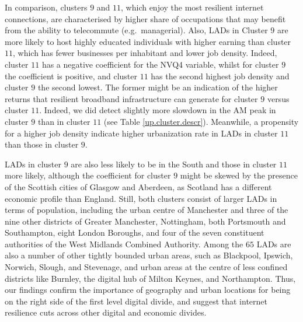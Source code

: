 \documentclass[Royal,times,sageh]{sagej}
\begin{document}
In comparison, clusters \(9\) and \(11\), which enjoy the most resilient
internet connections, are characterised by higher share of occupations
that may benefit from the ability to telecommute (e.g.~managerial).
Also, LADs in Cluster \(9\) are more likely to host highly educated
individuals with higher earning than cluster \(11\), which has fewer
businesses per inhabitant and lower job density. Indeed, cluster \(11\)
has a negative coefficient for the NVQ4 variable, whilst for cluster
\(9\) the coefficient is positive, and cluster \(11\) has the second
highest job density and cluster \(9\) the second lowest. The former
might be an indication of the higher returns that resilient broadband
infrastructure can generate for cluster \(9\) versus cluster \(11\).
Indeed, we did detect slightly more slowdown in the AM peak in cluster
\(9\) than in cluster \(11\) (see Table \ref{up.cluster.descr}).
Meanwhile, a propensity for a higher job density indicate higher
urbanization rate in LADs in cluster \(11\) than those in cluster \(9\).

LADs in cluster \(9\) are also less likely to be in the South and those
in cluster \(11\) more likely, although the coefficient for cluster
\(9\) might be skewed by the presence of the Scottish cities of Glasgow
and Aberdeen, as Scotland has a different economic profile than England.
Still, both clusters consist of larger LADs in terms of population,
including the urban centre of Manchester and three of the nine other
districts of Greater Manchester, Nottingham, both Portsmouth and
Southampton, eight London Boroughs, and four of the seven constituent
authorities of the West Midlands Combined Authority. Among the \(65\)
LADs are also a number of other tightly bounded urban areas, such as
Blackpool, Ipswich, Norwich, Slough, and Stevenage, and urban areas at
the centre of less confined districts like Burnley, the digital hub of
Milton Keynes, and Northampton. Thus, our findings confirm the
importance of geography and urban locations for being on the right side
of the first level digital divide, and suggest that internet resilience
cuts across other digital and economic divides.
\end{document}
